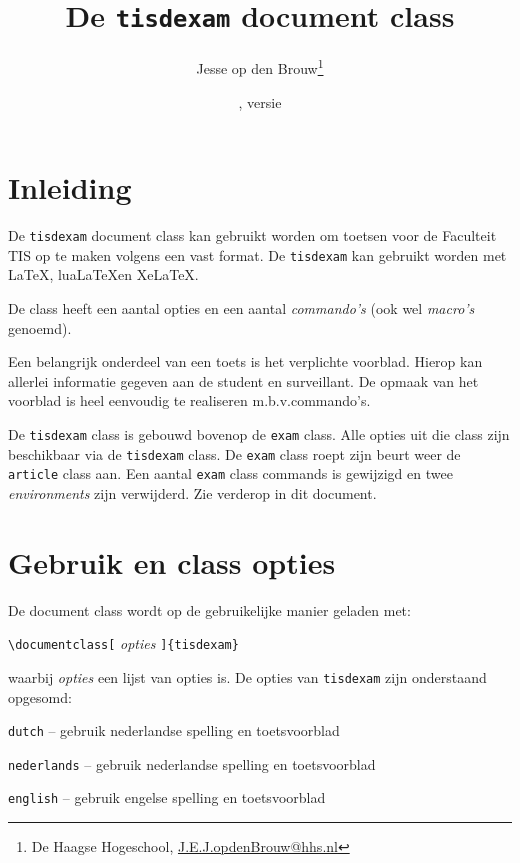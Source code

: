 \documentclass[dutch,a4paper,12pt,addpoints,fleqn,oneside]{tisdexam}
\newcommand\DocClass[1]{\texttt{#1}}
\newcommand\Option[1]{\texttt{#1}}
\begin{document}
\raggedbottom
\title{De \DocClass{tisdexam} document class}
\author{Jesse op den Brouw\thanks{De Haagse Hogeschool,
        \url{J.E.J.opdenBrouw@hhs.nl}}}
\date{\tisdexamfiledate, versie \tisdexamfileversion}
\maketitle
\setcounter{footnote}{1}


\section{Inleiding}
\label{sec:abstract}
De \DocClass{tisdexam} document class kan gebruikt worden om toetsen voor
de Faculteit TIS op te maken volgens een vast format. De \DocClass{tisdexam}
kan gebruikt worden met \LaTeX, lua\LaTeX en Xe\LaTeX.

\medskip
De class heeft een aantal opties en een aantal \textsl{commando's} (ook wel
\textsl{macro's} genoemd).

\medskip
Een belangrijk onderdeel van een toets is het verplichte voorblad. Hierop kan
allerlei informatie gegeven aan de student en surveillant. De opmaak van het
voorblad is heel eenvoudig te realiseren m.b.v.\@ commando's.

\medskip
De \DocClass{tisdexam} class is gebouwd bovenop de \DocClass{exam}
class. Alle opties uit die class zijn beschikbaar via de
\DocClass{tisdexam} class. De \DocClass{exam} class roept zijn
beurt weer de \DocClass{article} class aan.
Een aantal \DocClass{exam} class commands is gewijzigd en twee
\textsl{environments} zijn verwijderd. Zie verderop in dit document.


\section{Gebruik en class opties}
De document class wordt op de gebruikelijke manier geladen met:
\bigskip

\verb|\documentclass[| \textsl{opties} \verb|]{tisdexam}|
\bigskip

\noindent
waarbij \textsl{opties} een lijst van opties is. De opties van \DocClass{tisdexam} zijn
onderstaand opgesomd:
\smallskip

\Option{dutch} -- gebruik nederlandse spelling en toetsvoorblad

\Option{nederlands} -- gebruik nederlandse spelling  en toetsvoorblad

\Option{english} -- gebruik engelse spelling en toetsvoorblad
\end{document}
